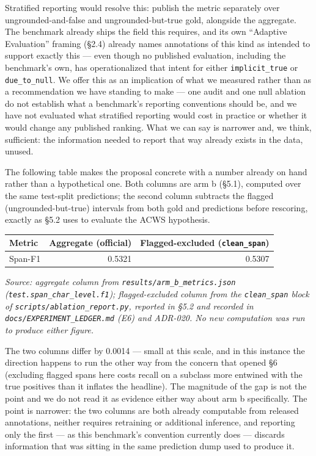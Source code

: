 \documentclass[11pt]{article}
\newcounter{none}
\begin{document}
Stratified reporting would resolve this: publish the metric separately over
ungrounded-and-false and ungrounded-but-true gold, alongside the aggregate. The benchmark
already ships the field this requires, and its own ``Adaptive Evaluation'' framing (§2.4)
already names annotations of this kind as intended to support exactly this --- even though no
published evaluation, including the benchmark's own, has operationalized that intent for
either \texttt{implicit\_true} or \texttt{due\_to\_null}. We offer this as an implication of what we measured
rather
than as a recommendation we have standing to make --- one audit and one null ablation do not
establish what a benchmark's reporting conventions should be, and we have not evaluated what
stratified reporting would cost in practice or whether it would change any published
ranking. What we can say is narrower and, we think, sufficient: the information needed to
report that way already exists in the data, unused.

The following table makes the proposal concrete with a number already on hand rather than a
hypothetical one. Both columns are arm b (§5.1), computed over the same test-split
predictions; the second column subtracts the flagged (ungrounded-but-true) intervals from
both gold and predictions before rescoring, exactly as §5.2 uses to evaluate the ACWS
hypothesis.

{\def\LTcaptype{none} %
\begin{longtable}[]{@{}lrr@{}}
\toprule\noalign{}
Metric & Aggregate (official) & Flagged-excluded (\texttt{clean\_span}) \\
\midrule\noalign{}
\endhead
\bottomrule\noalign{}
\endlastfoot
Span-F1 & 0.5321 & 0.5307 \\
\end{longtable}
}

\emph{Source: aggregate column from \texttt{results/arm\_b\_metrics.json} (\texttt{test.span\_char\_level.f1});
flagged-excluded column from the \texttt{clean\_span} block of \texttt{scripts/ablation\_report.py},
reported in §5.2 and recorded in \texttt{docs/EXPERIMENT\_LEDGER.md} (E6) and ADR-020. No new computation
was run to produce either figure.}

The two columns differ by 0.0014 --- small at this scale, and in this instance the direction
happens to run the other way from the concern that opened §6 (excluding flagged spans here
costs recall on a subclass more entwined with the true positives than it inflates the
headline). The magnitude of the gap is not the point and we do not read it as evidence either
way about arm b specifically. The point is narrower: the two columns are both already
computable from released annotations, neither requires retraining or additional inference,
and reporting only the first --- as this benchmark's convention currently does --- discards
information that was sitting in the same prediction dump used to produce it.
\end{document}
